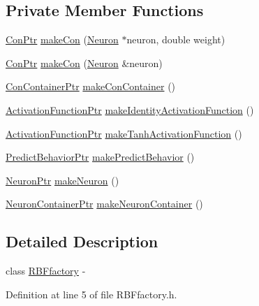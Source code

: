 \subsection*{Private Member Functions}
\begin{DoxyCompactItemize}
\item 
\hyperlink{_a_m_o_r_e_8h_a169bb8e5f26ce70bf2b10dec2fb5ee50}{ConPtr} \hyperlink{class_r_b_ffactory_a5068c3caacf0525f7069dbec4bf87a67}{makeCon} (\hyperlink{class_neuron}{Neuron} $\ast$neuron, double weight)
\item 
\hyperlink{_a_m_o_r_e_8h_a169bb8e5f26ce70bf2b10dec2fb5ee50}{ConPtr} \hyperlink{class_r_b_ffactory_a2e83beed580f5e85ccec5fcad2e87345}{makeCon} (\hyperlink{class_neuron}{Neuron} \&neuron)
\item 
\hyperlink{_a_m_o_r_e_8h_a1021dbaf961d1c8da6d58a8566e5778b}{ConContainerPtr} \hyperlink{class_r_b_ffactory_a0b85ec075904a9d915d1a3527f5d6471}{makeConContainer} ()
\item 
\hyperlink{_a_m_o_r_e_8h_a77602a0277a02e5769c3df0adc669b17}{ActivationFunctionPtr} \hyperlink{class_r_b_ffactory_a49489b75c9019c4eb08b04b333a476a0}{makeIdentityActivationFunction} ()
\item 
\hyperlink{_a_m_o_r_e_8h_a77602a0277a02e5769c3df0adc669b17}{ActivationFunctionPtr} \hyperlink{class_r_b_ffactory_a68c9c5fda0aee4350cf9e2ce3401145b}{makeTanhActivationFunction} ()
\item 
\hyperlink{_a_m_o_r_e_8h_a1fb2f1f8fdf1e08c42ef4bdce436af93}{PredictBehaviorPtr} \hyperlink{class_r_b_ffactory_a37c1e41af6f362767be462afcd417726}{makePredictBehavior} ()
\item 
\hyperlink{_a_m_o_r_e_8h_ac1ea936c2c7728eb382278131652fef4}{NeuronPtr} \hyperlink{class_r_b_ffactory_a91640e950fd3cea89cecf53517f42cef}{makeNeuron} ()
\item 
\hyperlink{_a_m_o_r_e_8h_a6157c259718f98f808c85d7f77048970}{NeuronContainerPtr} \hyperlink{class_r_b_ffactory_a9e304b053b54ad69c5b932cb0f30081c}{makeNeuronContainer} ()
\end{DoxyCompactItemize}


\subsection{Detailed Description}
class \hyperlink{class_r_b_ffactory}{RBFfactory} -\/ 

Definition at line 5 of file RBFfactory.h.



